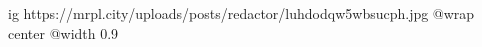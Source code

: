 
 
 
 
 

\ifcmt
  ig https://mrpl.city/uploads/posts/redactor/luhdodqw5wbsucph.jpg
  @wrap center
  @width 0.9
\fi
